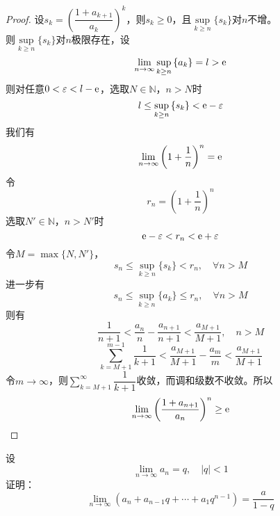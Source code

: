 \begin{proof}

    设$s_k = \left( \dfrac{1 + a_{k + 1}}{a_k} \right)^k$，则$s_k \geq 0$，且$\sup\limits_{k \geq n}\{s_k\}$对$n$不增。\\
    则$\sup\limits_{k \geq n}\{s_k\}$对$n$极限存在，设
    \[\lim\limits_{n \to \infty}{\sup_{k \geq n}{\{a_k\}}} = l > \mathrm{e}\]
    则对任意$0 < \varepsilon < l - \mathrm{e}$，选取$N \in \mathbb{N}$，$n > N$时
    \[l \leq \sup_{k \geq n }{\{s_k\}} < \mathrm{e} - \varepsilon\]
    我们有
    \[\lim\limits_{n \to \infty}{\left( 1 + \dfrac{1}{n} \right)^n} = \mathrm{e}\]
    令
    \[r_n = \left( 1 + \dfrac{1}{n} \right)^n\]
    选取$N' \in \mathbb{N}$，$n > N'$时
    \[\mathrm{e} - \varepsilon < r_n < \mathrm{e} + \varepsilon\]
    令$M = \max\{N, N'\}$，
    \[s_n \leq \sup_{k \geq n}\{s_k\} < r_n, \quad \forall n > M\]
    进一步有
    \[s_n \leq \sup_{k \geq n}\{a_k\} \leq r_n, \quad \forall n > M\]
    则有
    \[\dfrac{1}{n + 1} < \dfrac{a_n}{n} - \dfrac{a_{n + 1}}{n + 1} < \dfrac{a_{M + 1}}{M + 1}, \quad n > M\]
    \[\sum\limits_{k = M + 1}^{m - 1}{\dfrac{1}{k + 1}} < \dfrac{a_{M + 1}}{M + 1} - \dfrac{a_m}{m} < \dfrac{a_{M + 1}}{M + 1}\]
    令$m \to \infty$，则$\sum\limits_{k = M + 1}^{\infty}{\dfrac{1}{k + 1}}$收敛，而调和级数不收敛。所以
    \[\lim\limits_{n \to \infty}{\left( \dfrac{1 + a_{n + 1}}{a_n} \right)^n} \geq \mathrm{e}\]

\end{proof}

\begin{proposition}
    
    设
    \[\lim\limits_{n \to \infty}{a_n} = q, \quad |q| < 1\]
    证明：
    \[\lim\limits_{n \to \infty}{(a_n + a_{n - 1}q + \cdots + a_1q^{n - 1})} = \dfrac{a}{1 - q}\]

\end{proposition}

